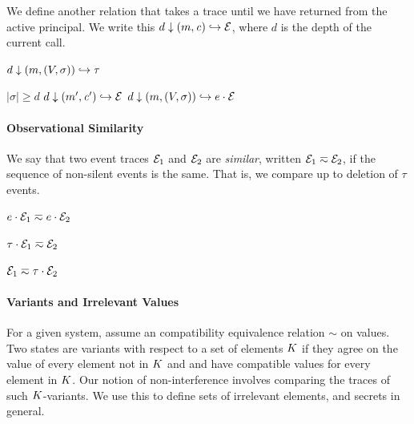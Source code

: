 \documentclass[10pt,conference]{ieeetran}%
\theoremstyle{definition}
\begin{document}
We define another relation that takes a trace until we have returned from the
active principal.
We write this \(d \downarrow (m,\mathit{c}) \hookrightarrow \mathcal{E}\), where
\(d\) is the depth of the current call.

         {\(d \downarrow (m,(V,\sigma)) \hookrightarrow \tau\)}

                  {\(|\sigma| \geq d\)}
                  {\(d \downarrow (m',\mathit{c}') \hookrightarrow \mathcal{E}\)}
                  {\(d \downarrow (m,(V,\sigma)) \hookrightarrow e \cdot \mathcal{E}\)}

\paragraph*{Observational Similarity}

We say that two event traces $\mathcal{E}_1$ and $\mathcal{E}_2$ are {\em similar},
written \(\mathcal{E}_1 \eqsim \mathcal{E}_2\), if the sequence of non-silent events
is the same. That is, we compare up to deletion of \(\tau\) events.

\begin{minipage}{.4\columnwidth}
  \judgment{}{\(\obsT \eqsim \obsT\)}
\end{minipage}
\begin{minipage}{.4\columnwidth}
           {\(e \cdot \mathcal{E}_1 \eqsim e \cdot \mathcal{E}_2\)}
\end{minipage}

\begin{minipage}{.4\columnwidth}
           {\(\tau \cdot \mathcal{E}_1 \eqsim \mathcal{E}_2\)}
\end{minipage}
\begin{minipage}{.4\columnwidth}
           {\(\mathcal{E}_1 \eqsim \tau \cdot \mathcal{E}_2\)}
\end{minipage}

\paragraph*{Variants and Irrelevant Values}


For a given system, assume an compatibility equivalence relation \(\sim\) on values.
Two states are variants with respect to a set of elements \(K\)
if they agree on the value of every element not in \(K\) and
and have compatible values for every element in \(K\).
Our notion of non-interference involves comparing the traces of such
\(K\)-variants. We use this to define sets of irrelevant elements,
and secrets in general.
\end{document}
